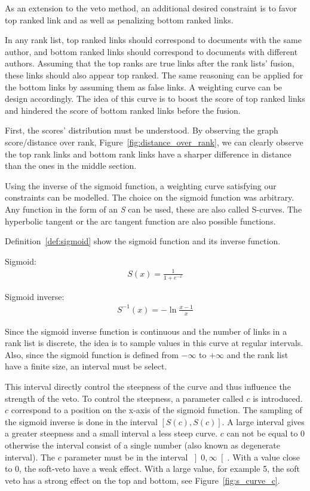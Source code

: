 As an extension to the veto method, an additional desired constraint is to favor top ranked link and as well as penalizing bottom ranked links.

In any rank list, top ranked links should correspond to documents with the same author, and bottom ranked links should correspond to documents with different authors.
Assuming that the top ranks are true links after the rank lists' fusion, these links should also appear top ranked.
The same reasoning can be applied for the bottom links by assuming them as false links.
A weighting curve can be design accordingly.
The idea of this curve is to boost the score of top ranked links and hindered the score of bottom ranked links before the fusion.

First, the scores' distribution must be understood.
By observing the graph score/distance over rank, Figure~\ref{fig:distance_over_rank}, we can clearly observe the top rank links and bottom rank links have a sharper difference in distance than the ones in the middle section.

Using the inverse of the sigmoid function, a weighting curve satisfying our constraints can be modelled.
The choice on the sigmoid function was arbitrary.
Any function in the form of an \textit{S} can be used, these are also called S-curves.
The hyperbolic tangent or the arc tangent function are also possible functions.

Definition~\ref{def:sigmoid} show the sigmoid function and its inverse function.

\begin{definition}
  Sigmoid:
  \begin{gather*}
    S(x) = \frac{1}{1+e^{-x}}
  \end{gather*}

  Sigmoid inverse:
  \begin{gather*}
    S^{-1}(x) = -\ln{\frac{x-1}{x}}
  \end{gather*}
\end{definition}

Since the sigmoid inverse function is continuous and the number of links in a rank list is discrete, the idea is to sample values in this curve at regular intervals.
Also, since the sigmoid function is defined from $-\infty$ to $+\infty$ and the rank list have a finite size, an interval must be select.

This interval directly control the steepness of the curve and thus influence the strength of the veto.
To control the steepness, a parameter called $c$ is introduced.
$c$ correspond to a position on the x-axis of the sigmoid function.
The sampling of the sigmoid inverse is done in the interval $\left[S(c), S(c)\right]$.
A large interval gives a greater steepness and a small interval a less steep curve.
$c$ can not be equal to 0 otherwise the interval consist of a single number (also known as degenerate interval).
The $c$ parameter must be in the interval $\left]0, \infty\right[$.
With a value close to $0$, the soft-veto have a weak effect.
With a large value, for example 5, the soft veto has a strong effect on the top and bottom, see Figure~\ref{fig:s_curve_c}.

